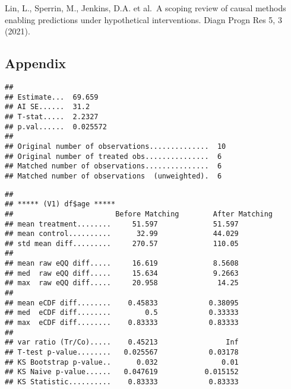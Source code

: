 \documentclass[
]{article}
\newenvironment{Shaded}{\begin{snugshade}}{\end{snugshade}}
\newcommand{\AttributeTok}[1]{\textcolor[rgb]{0.13,0.29,0.53}{#1}}
\newcommand{\DecValTok}[1]{\textcolor[rgb]{0.00,0.00,0.81}{#1}}
\newcommand{\FunctionTok}[1]{\textcolor[rgb]{0.13,0.29,0.53}{\textbf{#1}}}
\newcommand{\NormalTok}[1]{#1}
\newcommand{\OtherTok}[1]{\textcolor[rgb]{0.56,0.35,0.01}{#1}}
\newcommand{\SpecialCharTok}[1]{\textcolor[rgb]{0.81,0.36,0.00}{\textbf{#1}}}
\newcommand{\StringTok}[1]{\textcolor[rgb]{0.31,0.60,0.02}{#1}}
\begin{document}
Lin, L., Sperrin, M., Jenkins, D.A. et al.~A scoping review of causal
methods enabling predictions under hypothetical interventions. Diagn
Progn Res 5, 3 (2021).

\hypertarget{appendix}{%
\subsection{Appendix}\label{appendix}}

\begin{Shaded}
\end{Shaded}

\begin{verbatim}
## 
## Estimate...  69.659 
## AI SE......  31.2 
## T-stat.....  2.2327 
## p.val......  0.025572 
## 
## Original number of observations..............  10 
## Original number of treated obs...............  6 
## Matched number of observations...............  6 
## Matched number of observations  (unweighted).  6
\end{verbatim}

\begin{Shaded}
\end{Shaded}

\begin{verbatim}
## 
## ***** (V1) df$age *****
##                        Before Matching        After Matching
## mean treatment........     51.597             51.597 
## mean control..........      32.99             44.029 
## std mean diff.........     270.57             110.05 
## 
## mean raw eQQ diff.....     16.619             8.5608 
## med  raw eQQ diff.....     15.634             9.2663 
## max  raw eQQ diff.....     20.958              14.25 
## 
## mean eCDF diff........    0.45833            0.38095 
## med  eCDF diff........        0.5            0.33333 
## max  eCDF diff........    0.83333            0.83333 
## 
## var ratio (Tr/Co).....    0.45213                Inf 
## T-test p-value........   0.025567            0.03178 
## KS Bootstrap p-value..      0.032               0.01 
## KS Naive p-value......   0.047619           0.015152 
## KS Statistic..........    0.83333            0.83333
\end{verbatim}
\end{document}
